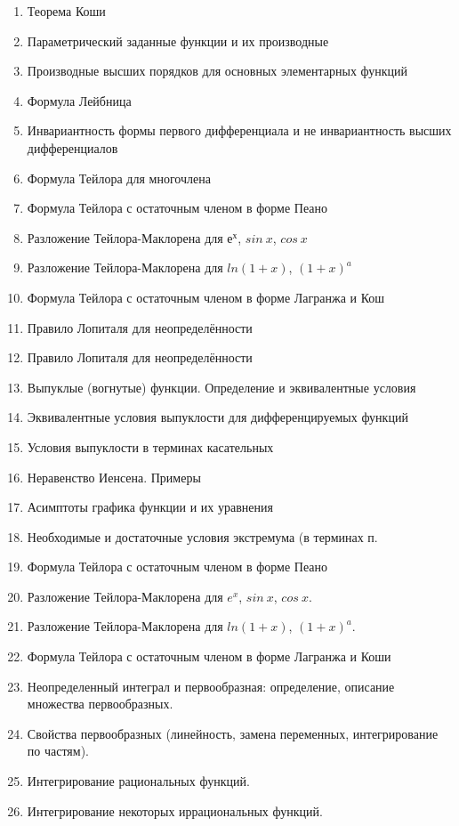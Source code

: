 \documentclass{article}
\begin{document}
\begin{enumerate}
    \item Теорема Коши
    \item Параметрический заданные функции и их производные
    \item Производные высших порядков для основных элементарных функций 
    \item Формула Лейбница 
    \item Инвариантность формы первого дифференциала и не инвариантность высших дифференциалов 
    \item Формула Тейлора для многочлена
    \item Формула Тейлора с остаточным членом в форме Пеано 
    \item Разложение Тейлора-Маклорена для $е^х$, $sin\ x$, $cos\ x$
    \item Разложение Тейлора-Маклорена для $ln(1+x)$, $(1+x)^a$
    \item Формула Тейлора с остаточным членом в форме Лагранжа и Кош 
    \item Правило Лопиталя для неопределённости
    \item Правило Лопиталя для неопределённости
    \item Выпуклые (вогнутые) функции. Определение и эквивалентные условия 
    \item Эквивалентные условия выпуклости для дифференцируемых функций 
    \item Условия выпуклости в терминах касательных 
    \item Неравенство Иенсена. Примеры 
    \item Асимптоты графика функции и их уравнения 
    \item Необходимые и достаточные условия экстремума (в терминах п. 
    \item Формула Тейлора с остаточным членом в форме Пеано 
    \item Разложение Тейлора-Маклорена для $e^x$, $sin\ x$, $cos\ x$. 
    \item Разложение Тейлора-Маклорена для $ln(1+x)$, $(1+x)^a$. 
    \item Формула Тейлора с остаточным членом в форме Лагранжа и Коши 
    \item Неопределенный интеграл и первообразная: определение, описание множества первообразных. 
    \item Свойства первообразных (линейность, замена переменных, интегрирование по частям). 
    \item Интегрирование рациональных функций. 
    \item Интегрирование некоторых иррациональных функций. 

\end{enumerate}
\end{document}
